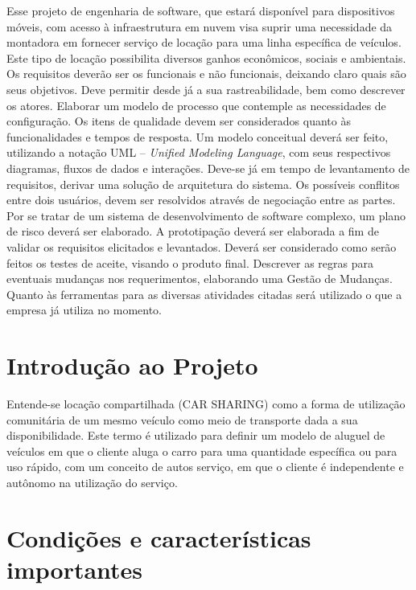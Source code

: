 \documentclass[12pt]{article}
\begin{document}
\begin{resumo} 

Esse projeto de engenharia de software, que estará disponível para dispositivos móveis, com acesso à infraestrutura em nuvem visa suprir uma necessidade da montadora em fornecer serviço de locação para uma linha específica de veículos. Este tipo de locação possibilita diversos ganhos econômicos, sociais e ambientais. 
Os requisitos deverão ser os funcionais e não funcionais, deixando claro quais são seus objetivos. Deve permitir desde já a sua rastreabilidade, bem como descrever os  atores. Elaborar um modelo de processo que contemple as necessidades de configuração.
Os itens de qualidade devem ser considerados quanto às funcionalidades   e tempos de resposta.
Um modelo conceitual deverá ser feito, utilizando a notação UML – \textit{Unified Modeling Language}, com seus respectivos diagramas, fluxos de dados e interações.
Deve-se já em tempo de levantamento de requisitos, derivar uma solução de arquitetura do sistema.
Os possíveis conflitos entre dois usuários, devem ser resolvidos através de negociação entre as partes. 
Por se tratar de um sistema de desenvolvimento de software complexo, um plano de risco deverá ser elaborado. 
A prototipação deverá ser elaborada a fim de validar os requisitos elicitados e levantados.
Deverá ser considerado como serão feitos os testes de aceite, visando o produto final.
Descrever as regras para eventuais mudanças nos requerimentos, elaborando uma Gestão de Mudanças.
Quanto às ferramentas para as diversas atividades citadas será utilizado o que a empresa já utiliza no momento.

\end{resumo}


\section{Introdução ao Projeto}



Entende-se locação compartilhada (CAR SHARING) como a forma de utilização comunitária de um mesmo veículo como meio de transporte dada a sua disponibilidade. Este termo é utilizado para definir um modelo de aluguel de veículos em que o cliente aluga o carro para uma quantidade específica ou para uso rápido, com um conceito de autos serviço, em que o cliente é independente e autônomo na utilização do serviço.

\section{Condições e características importantes}
\end{document}

